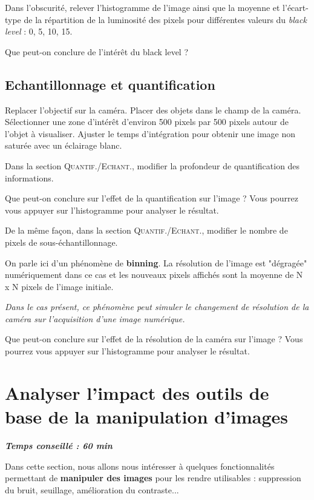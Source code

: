 \documentclass[a4paper,11pt,titlepage]{article} %
\begin{document}
\Manip Dans l'obscurité, relever l'histogramme de l'image ainsi que la moyenne et l'écart-type de la répartition de la luminosité des pixels pour différentes valeurs du \textit{black level} : 0, 5, 10, 15.

\Quest Que peut-on conclure de l'intérêt du black level ?

\subsection{Echantillonnage et quantification}

\Manip Replacer l'objectif sur la caméra. Placer des objets dans le champ de la caméra. Sélectionner une zone d'intérêt d'environ 500 pixels par 500 pixels autour de l'objet à visualiser. Ajuster le temps d'intégration pour obtenir une image non saturée avec un éclairage blanc. 

\Manip Dans la section \textsc{Quantif./Echant.}, modifier la profondeur de quantification des informations. 

\Quest Que peut-on conclure sur l'effet de la quantification sur l'image ? Vous pourrez vous appuyer sur l'histogramme pour analyser le résultat.

\Manip De la même façon, dans la section \textsc{Quantif./Echant.}, modifier le nombre de pixels de sous-échantillonnage. 

On parle ici d'un phénomène de \textbf{binning}. La résolution de l'image est "dégragée" numériquement dans ce cas et les nouveaux pixels affichés sont la moyenne de N x N pixels de l'image initiale.

\textit{Dans le cas présent, ce phénomène peut simuler le changement de résolution de la caméra sur l'acquisition d'une image numérique.}

\Quest Que peut-on conclure sur l'effet de la résolution de la caméra sur l'image ? Vous pourrez vous appuyer sur l'histogramme pour analyser le résultat.


\newpage
\section{Analyser l'impact des outils de base de la manipulation d'images}

\begin{center} \textbf{\textit{Temps conseillé : 60 min}} \end{center}

Dans cette section, nous allons nous intéresser à quelques fonctionnalités permettant de \textbf{manipuler des images} pour les rendre utilisables : suppression du bruit, seuillage, amélioration du contraste...
\end{document}
